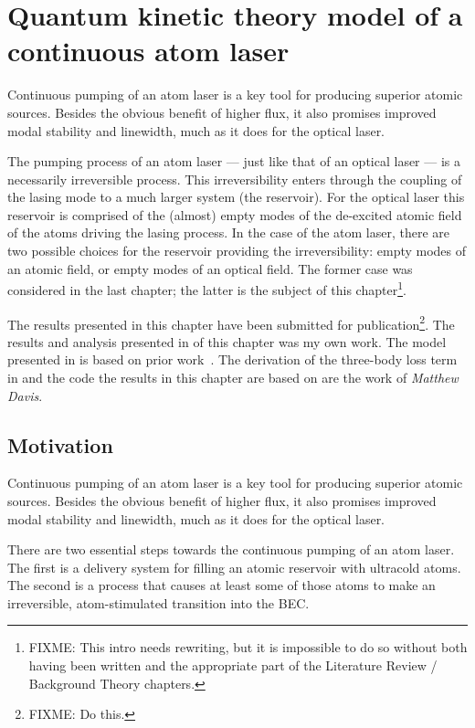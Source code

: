 \chapter{Quantum kinetic theory model of a continuous atom laser}
\label{KineticTheory}
\graphicspath{{Figures/KineticTheory/}{Figures/Common/}}

Continuous pumping of an atom laser is a key tool for producing superior atomic sources. Besides the obvious benefit of higher flux, it also promises improved modal stability and linewidth, much as it does for the optical laser.

The pumping process of an atom laser --- just like that of an optical laser --- is a necessarily irreversible process. This irreversibility enters through the coupling of the lasing mode to a much larger system (the reservoir). For the optical laser this reservoir is comprised of the (almost) empty modes of the de-excited atomic field of the atoms driving the lasing process. In the case of the atom laser, there are two possible choices for the reservoir providing the irreversibility: empty modes of an atomic field, or empty modes of an optical field. The former case was considered in the last chapter; the latter is the subject of this chapter\footnote{FIXME: This intro needs rewriting, but it is impossible to do so without both  having been written and the appropriate part of the Literature Review / Background Theory chapters.}. 

The results presented in this chapter have been submitted for publication\footnote{FIXME: Do this.}.  The results and analysis presented in  of this chapter was my own work. The model presented in  is based on prior work~\citep{Davis:2000vn,Bijlsma:2000}. The derivation of the three-body loss term in  and the code the results in this chapter are based on are the work of \emph{Matthew Davis}.

\section{Motivation}

Continuous pumping of an atom laser is a key tool for producing superior atomic sources. Besides the obvious benefit of higher flux, it also promises improved modal stability and linewidth, much as it does for the optical laser.

There are two essential steps towards the continuous pumping of an atom laser. The first is a delivery system for filling an atomic reservoir with ultracold atoms. The second is a process that causes at least some of those atoms to make an irreversible, atom-stimulated transition into the BEC.

